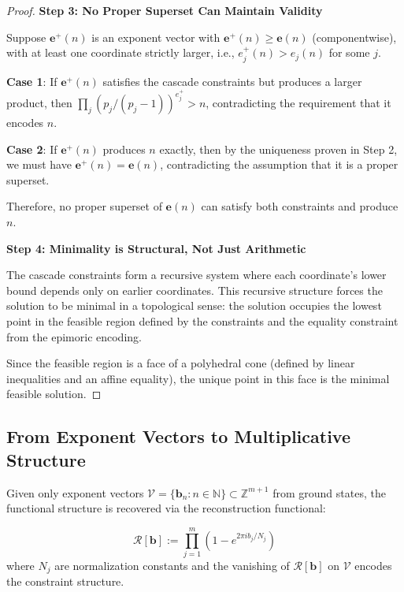 \begin{proof}
\noindent \textbf{Step 3: No Proper Superset Can Maintain Validity}

Suppose $\mathbf{e}^+(n)$ is an exponent vector with $\mathbf{e}^+(n) \geq \mathbf{e}(n)$ (componentwise), with at least one coordinate strictly larger, i.e., $e^+_j(n) > e_j(n)$ for some $j$.

\textbf{Case 1}: If $\mathbf{e}^+(n)$ satisfies the cascade constraints but produces a larger product, then $\prod_j (p_j/(p_j-1))^{e^+_j} > n$, contradicting the requirement that it encodes $n$.

\textbf{Case 2}: If $\mathbf{e}^+(n)$ produces $n$ exactly, then by the uniqueness proven in Step 2, we must have $\mathbf{e}^+(n) = \mathbf{e}(n)$, contradicting the assumption that it is a proper superset.

Therefore, no proper superset of $\mathbf{e}(n)$ can satisfy both constraints and produce $n$.

\noindent \textbf{Step 4: Minimality is Structural, Not Just Arithmetic}

The cascade constraints form a recursive system where each coordinate's lower bound depends only on earlier coordinates. This recursive structure forces the solution to be minimal in a topological sense: the solution occupies the lowest point in the feasible region defined by the constraints and the equality constraint from the epimoric encoding.

Since the feasible region is a face of a polyhedral cone (defined by linear inequalities and an affine equality), the unique point in this face is the minimal feasible solution.

\end{proof}

\subsection{From Exponent Vectors to Multiplicative Structure}
\label{subsec:exponent-to-multiplicative}

Given only exponent vectors $\mathcal{V} = \{\mathbf{b}_n : n \in \mathbb{N}\} \subset \mathbb{Z}^{m+1}$ from ground states, the functional structure is recovered via the reconstruction functional:

\begin{definition}
\begin{equation}
\label{eq:reconstruction-functional}
\mathcal{R}[\mathbf{b}] := \prod_{j=1}^m \left( 1 - e^{2\pi i b_j / N_j} \right)
\end{equation}
where $N_j$ are normalization constants and the vanishing of $\mathcal{R}[\mathbf{b}]$ on $\mathcal{V}$ encodes the constraint structure.
\end{definition}

